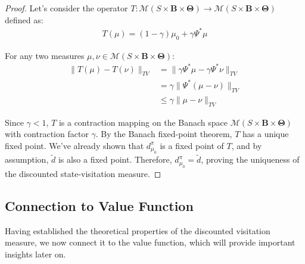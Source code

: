 \begin{proof}
    Let's consider the operator
    $T: \mathcal{M}(S \times \boldsymbol{B}\times \boldsymbol{\Theta}) \to \mathcal{M}
        (S \times \boldsymbol{B}\times \boldsymbol{\Theta})$
    defined as:
    \begin{align}
        T(\mu) = (1-\gamma)\mu_{0} + \gamma \Psi^{*} \mu
    \end{align}

    For any two measures
    $\mu, \nu \in \mathcal{M}(S \times \boldsymbol{B}\times \boldsymbol{\Theta})$:
    \begin{align}
        \|T(\mu) - T(\nu)\|_{TV} & = \|\gamma \Psi^{*} \mu - \gamma \Psi^{*} \nu\|_{TV} \\
                                 & = \gamma \|\Psi^{*} (\mu - \nu)\|_{TV}               \\
                                 & \leq \gamma \|\mu - \nu\|_{TV}
    \end{align}

    Since $\gamma < 1$, $T$ is a contraction mapping on the Banach space $\mathcal{M}
        (S \times \boldsymbol{B}\times \boldsymbol{\Theta})$ with contraction factor $\gamma$.
    By the Banach fixed-point theorem, $T$ has a unique fixed point. We've already
    shown that $d^{\pi}_{\mu_0}$ is a fixed point of $T$, and by assumption,
    $\tilde{d}$ is also a fixed point. Therefore, $d^{\pi}_{\mu_0}= \tilde{d}$, proving
    the uniqueness of the discounted state-visitation measure.
\end{proof}

\subsection{Connection to Value Function}
Having established the theoretical properties of the discounted visitation
measure, we now connect it to the value function, which will provide important
insights later on.

